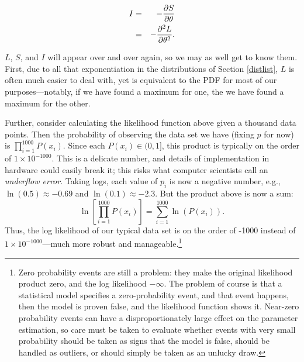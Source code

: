 \begin{eqnarray}
I&=&-{\partial S \over \partial \theta}			\nonumber\\
&=&-{\partial^2 L \over \partial \theta^2}.		\nonumber
\end{eqnarray}

$L$, $S$, and $I$ will appear over and over again, so we may as well get
to know them. First, due to all that exponentiation in the distributions
of Section \ref{distlist}, $L$ is often much easier to deal with, yet
is equivalent to the PDF for most of our purposes---notably, if we have
found a maximum for one, the we have found a maximum for the other.

Further, consider calculating the likelihood function above given
a thousand data points.  Then the probability of observing the data set
we have (fixing $p$ for now) is $\prod_{i=1}^{1000} P(x_i)$.  Since each
$P(x_i)\in (0,1]$, this product is typically on the order of $1\times
10^{-1000}$. This is a delicate number, and details of implementation in
hardware could easily break it; this risks what computer scientists call an
{\sl underflow error}. Taking logs, each value of $p_i$ is now a negative
number, e.g., $\ln(0.5)\approx -0.69$ and $\ln(0.1)\approx -2.3$.  But the
product above is now a sum: $$\ln\left[\prod_{i=1}^{1000} P(x_i)\right]
= \sum_{i=1}^{1000} \ln(P(x_i)).$$ Thus, the log likelihood of our typical
data set is on the order of -1000 instead of $1\times 10^{-1000}$---much
more robust and manageable.\footnote{Zero probability events are still
a problem: they make the original likelihood product zero, and the log
likelihood $-\infty$. The problem of course is that a statistical model
specifies a zero-probability event, and that event happens, then the
model is proven false, and the likelihood function shows it. Near-zero
probability events can have a disproportionately large effect on the
parameter estimation, so care must be taken to evaluate whether events with very
small probability should be taken as signs that the model is false,
should be handled as outliers, or should simply be taken as an unlucky
draw.}

